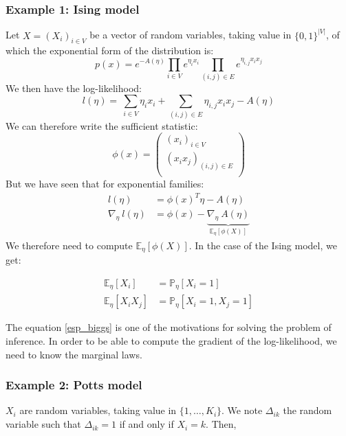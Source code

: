 \documentclass[12pt,a4paper]{report}
\newcommand{\forscribe}[2]{#2}  %
\begin{document}
\subsubsection*{Example 1: Ising model} 
Let $X=(X_i)_{i \in V}$ be a vector of random variables, taking value in $\{0,1\}^{|V|}$, of which the exponential form of the distribution is:
\begin{equation}
	p(x) =e^{-A(\eta)} \prod_{i \in V} e^{\eta_i x_i} \prod_{(i,j) \in E} e^{\eta_{i,j} x_i x_j} 
\end{equation}
We then have the log-likelihood:
\begin{equation}
	l(\eta) = \ \sum_{i \in V} \eta_i x_i + \sum_{(i,j) \in E} \eta_{i,j} x_i x_j -A(\eta)
\end{equation}
We can \forscribe{hence}{therefore} write the sufficient statistic:
\begin{equation}
	\phi(x) = 
	\begin{pmatrix}
		(x_i)_{i \in V} \\
		(x_i x_j)_{(i,j) \in E} \\
	\end{pmatrix}
\end{equation}
But we have seen that for exponential families:
\begin{align}
	l(\eta) &= \phi(x)^T \eta - A(\eta) \\
	\nabla_{\eta} \ l(\eta) &= \phi(x) - \underbrace{\nabla_{\eta} \ A (\eta)}_{\mathbb{E}_{\eta} [\phi(X)]}
\end{align}
We therefore need to compute \(\mathbb{E}_{\eta} [\phi(X)]\). In the case of the Ising model, we get:

\begin{align}
\label{esp_biggs}
	\mathbb{E}_{\eta} [X_i] 		&= \mathbb{P}_{\eta} [X_i = 1]\\
	\mathbb{E}_{\eta} [X_iX_j] 	&= \mathbb{P}_{\eta} [X_i = 1, X_j = 1]
\end{align}

The equation \ref{esp_biggs} is one of the motivations for solving the problem of inference. In order to be able to compute the gradient of the log-likelihood, we need to know the marginal laws. 

\subsubsection*{Example 2: Potts model} 
\( X_i\) are random variables, taking value in \(\{1,\dots,K_i\}\). We note $\Delta_{ik}$ the random variable such that \( \Delta_{ik} = 1 \) if and only if \( X_i = k \). Then,
\end{document}
